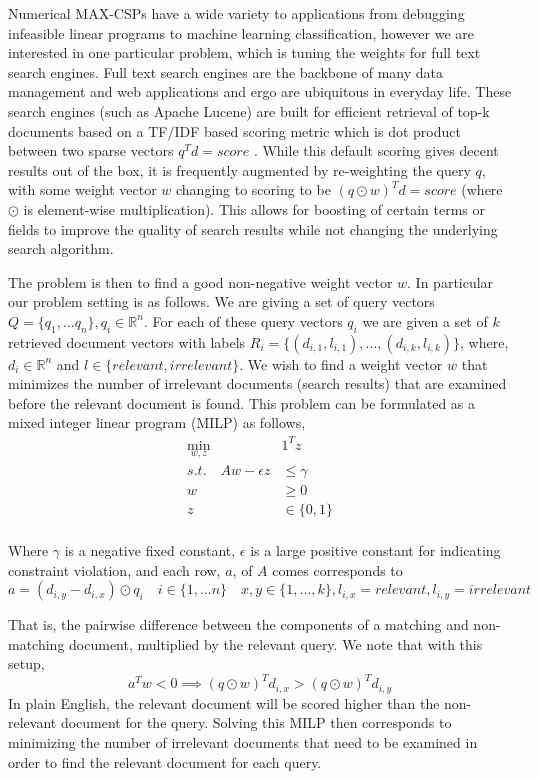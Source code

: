 \documentclass[a4paper]{article}
\begin{document}
Numerical MAX-CSPs have a wide variety to applications from debugging
infeasible linear programs to machine learning classification, however we are
interested in one particular problem, which is tuning the weights for
full text search engines.  Full text search engines are the backbone of 
many data management and web applications and ergo are ubiquitous in 
everyday life. These search engines (such as Apache Lucene) are built for
efficient retrieval of top-k documents based on a TF/IDF based scoring metric
which is dot product between two sparse vectors $q^Td =
score$\cite{lucene_history} \cite{WAND_paper} \cite{block_max_WAND_paper}.
While this default scoring gives decent results out of the box, it is
frequently augmented by re-weighting the query $q$, with some weight vector $w$
changing to scoring to be $(q\odot w)^Td = score$ (where $\odot$ is element-wise multiplication).
This allows for boosting of certain terms or fields to improve the quality of
search results while not changing the underlying search algorithm. 

The problem is then to find a good non-negative weight vector $w$. In particular our
problem setting is as follows. We are giving a set of query vectors $Q = \{q_1, ... q_n\}, q_i \in \mathds{R}^n$. For each 
of these query vectors $q_i$ we are given a set of $k$ retrieved document vectors with labels $R_i = \{(d_{i,1}, l_{i,1}), ..., (d_{i, k}, l_{i,k})\}$, 
where, $d_i \in \mathds{R}^n$ and $l \in \{relevant, irrelevant\}$.
We wish to find a weight vector $w$ that minimizes the number of irrelevant documents (search results) that are examined 
before the relevant document is found. This problem can be formulated as a mixed integer linear program (MILP) as follows,
\begin{align*}
\min_{w,z}\quad &1^Tz\\
s.t. \quad Aw - \epsilon z &\leq \gamma\\
		w &\geq 0\\
		z &\in \{0,1\}\\
\end{align*}

Where $\gamma$ is a negative fixed constant, $\epsilon$ is a large positive constant for 
indicating constraint violation, and each row, $a$, of $A$ comes corresponds to 
$$
a = (d_{i,y} - d_{i,x}) \odot q_i  \quad i \in \{1,...n\} \quad x,y \in \{1,...,k\}, l_{i,x} = relevant, l_{i,y} = irrelevant
$$

That is, the pairwise difference between the components of a matching and non-matching document, multiplied by the 
relevant query. We note that with this setup, 
$$
a^Tw < 0 \implies (q\odot w)^Td_{i,x} > (q\odot w)^Td_{i,y}
$$
In plain English, the relevant document will be scored higher than the
non-relevant document for the query. Solving this MILP then corresponds to
minimizing the number of irrelevant documents that need to be examined in order
to find the relevant document for each query. 
\end{document}

